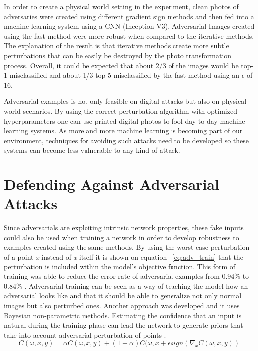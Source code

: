 In order to create a physical world setting in the experiment, clean photos of adversaries were created using different gradient sign methods and then fed into a machine learning system using a CNN (Inception V3). Adversarial Images created using the fast method were more robust when compared to the iterative methods. The explanation of the result is that iterative methods create more subtle perturbations that can be easily be destroyed by the photo transformation process. Overall, it could be expected that about 2/3 of the images would be top-1 misclassified and about 1/3 top-5 misclassified by the fast method using an $\epsilon$ of 16.

Adversarial examples is not only feasible on digital attacks but also on physical world scenarios. By using the correct perturbation algorithm with optimized hyperparameters one can use printed digital photos to fool day-to-day machine learning systems. As more and more machine learning is becoming part of our environment, techniques for avoiding such attacks need to be developed so these systems can become less vulnerable to any kind of attack.

\section{Defending Against Adversarial Attacks}\label{sec:robustness}

Since adversarials are exploiting intrinsic network properties, these fake inputs could also be used when training a network in order to develop robustness to examples created using the same methods. By using the worst case perturbation of a point \textit{x} instead of \textit{x} itself it is shown on equation ~\ref{eq:adv_train} that the perturbation is included within the model's objective function. This form of training was able to reduce the error rate of adversarial examples from 0.94\% to 0.84\% \cite{goodfellow2014}. Adversarial training can be seen as a way of teaching the model how an adversarial looks like and that it should be able to generalize not only normal images but also perturbed ones. Another approach was developed and it uses Bayesian non-parametric methods. Estimating the confidence that an input is natural during the training phase can lead the network to generate priors that take into account adversarial perturbation of points \cite{billovits}. 
\begin{equation} \label{eq:adv_train}
C(\omega,x,y) = \alpha C(\omega ,x,y) + (1-\alpha )C(\omega ,x+\epsilon sign(\nabla_{x}C(\omega,x,y))
\end{equation}

